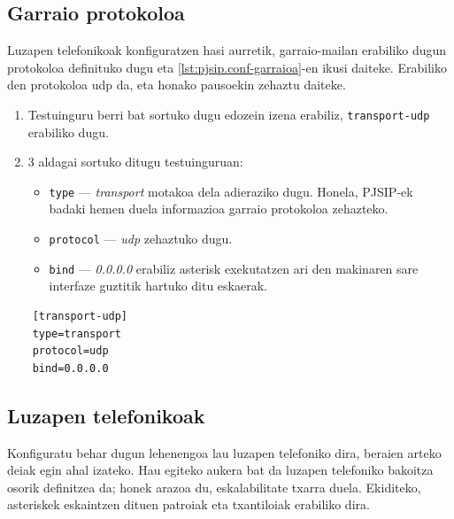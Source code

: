 \subsection{Garraio protokoloa}

Luzapen telefonikoak konfiguratzen hasi aurretik, garraio-mailan erabiliko dugun protokoloa definituko dugu eta \autoref{lst:pjsip.conf-garraioa}-en ikusi daiteke. Erabiliko den protokoloa \gls{udp} da, eta honako pausoekin zehaztu daiteke.
\begin{enumerate}
    \item Testuinguru berri bat sortuko dugu edozein izena erabiliz, \texttt{transport-udp} erabiliko dugu.
    \item 3 aldagai sortuko ditugu testuinguruan:
    \begin{itemize}
        \item \texttt{type} --- \textit{transport} motakoa dela adieraziko dugu. Honela, PJSIP-ek badaki hemen duela informazioa garraio protokoloa zehazteko.
        \item \texttt{protocol} --- \textit{udp} zehaztuko dugu.
        \item \texttt{bind} --- \textit{0.0.0.0} erabiliz asterisk exekutatzen ari den makinaren sare interfaze guztitik hartuko ditu eskaerak.
    \end{itemize}
\end{enumerate}

\begin{listing}
    \begin{verbatim}
    [transport-udp]
    type=transport
    protocol=udp
    bind=0.0.0.0
    \end{verbatim}
    \caption{Garraio-mailako protokoloaren konfigurazioa pjsip.conf konfigurazio fitxategian}
    \label{lst:pjsip.conf-garraioa}
\end{listing}

\subsection{Luzapen telefonikoak}

Konfiguratu behar dugun lehenengoa lau luzapen telefoniko dira, beraien arteko deiak egin ahal izateko. Hau egiteko aukera bat da luzapen telefoniko bakoitza osorik definitzea da; honek arazoa du, eskalabilitate txarra duela. Ekiditeko, asteriskek eskaintzen dituen patroiak eta txantiloiak erabiliko dira.

